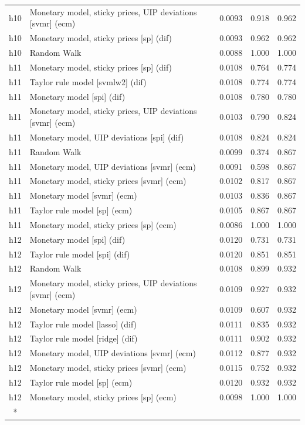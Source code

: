 \begin{ThreePartTable}
\begin{longtable}[t]{cp{5.5cm}ccc}
h10 & \raggedright Monetary model, sticky prices, UIP deviations [svmr] (ecm) & 0.0093 & 0.918 & 0.962\\
h10 & \raggedright Monetary model, sticky prices [sp] (dif) & 0.0093 & 0.962 & 0.962\\
h10 & \raggedright Random Walk & 0.0088 & 1.000 & 1.000\\
\addlinespace
h11 & \raggedright Monetary model, sticky prices [sp] (dif) & 0.0108 & 0.764 & 0.774\\
h11 & \raggedright Taylor rule model [svmlw2] (dif) & 0.0108 & 0.774 & 0.774\\
h11 & \raggedright Monetary model [spi] (dif) & 0.0108 & 0.780 & 0.780\\
h11 & \raggedright Monetary model, sticky prices, UIP deviations [svmr] (ecm) & 0.0103 & 0.790 & 0.824\\
h11 & \raggedright Monetary model, UIP deviations [spi] (dif) & 0.0108 & 0.824 & 0.824\\
h11 & \raggedright Random Walk & 0.0099 & 0.374 & 0.867\\
h11 & \raggedright Monetary model, UIP deviations [svmr] (ecm) & 0.0091 & 0.598 & 0.867\\
h11 & \raggedright Monetary model, sticky prices [svmr] (ecm) & 0.0102 & 0.817 & 0.867\\
h11 & \raggedright Monetary model [svmr] (ecm) & 0.0103 & 0.836 & 0.867\\
h11 & \raggedright Taylor rule model [sp] (ecm) & 0.0105 & 0.867 & 0.867\\
h11 & \raggedright Monetary model, sticky prices [sp] (ecm) & 0.0086 & 1.000 & 1.000\\
\addlinespace
h12 & \raggedright Monetary model [spi] (dif) & 0.0120 & 0.731 & 0.731\\
h12 & \raggedright Taylor rule model [spi] (dif) & 0.0120 & 0.851 & 0.851\\
h12 & \raggedright Random Walk & 0.0108 & 0.899 & 0.932\\
h12 & \raggedright Monetary model, sticky prices, UIP deviations [svmr] (ecm) & 0.0109 & 0.927 & 0.932\\
h12 & \raggedright Monetary model [svmr] (ecm) & 0.0109 & 0.607 & 0.932\\
h12 & \raggedright Taylor rule model [lasso] (dif) & 0.0111 & 0.835 & 0.932\\
h12 & \raggedright Taylor rule model [ridge] (dif) & 0.0111 & 0.902 & 0.932\\
h12 & \raggedright Monetary model, UIP deviations [svmr] (ecm) & 0.0112 & 0.877 & 0.932\\
h12 & \raggedright Monetary model, sticky prices [svmr] (ecm) & 0.0115 & 0.752 & 0.932\\
h12 & \raggedright Taylor rule model [sp] (ecm) & 0.0120 & 0.932 & 0.932\\
h12 & \raggedright Monetary model, sticky prices [sp] (ecm) & 0.0098 & 1.000 & 1.000\\*
\end{longtable}
\end{ThreePartTable}
\endgroup{}
